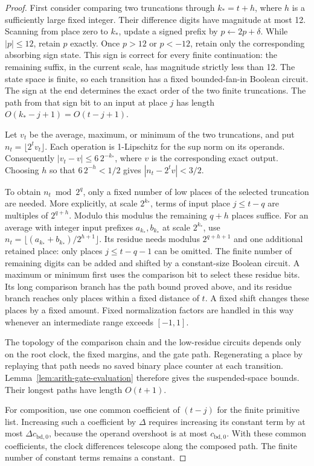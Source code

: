 \documentclass[11pt]{article}
\numberwithin{equation}{section}
\theoremstyle{definition}
\theoremstyle{remark}
\begin{document}
\begin{proof}
First consider comparing two truncations through ${k_*}=t+h$, where $h$
is a sufficiently large fixed integer.  Their difference digits have
magnitude at most 12.  Scanning from place zero to ${k_*}$, update a signed
prefix by $p\leftarrow2p+\delta$.  While $|p|\leq12$, retain $p$
exactly.  Once $p>12$ or $p<-12$, retain only the corresponding
absorbing sign state.  This sign is correct for every finite
continuation: the remaining suffix, in the current scale, has
magnitude strictly less than 12.  The state space is finite, so each
transition has a fixed bounded-fan-in Boolean circuit.  The sign
at the end determines the exact order of the two finite truncations.
The path from that sign bit to an input at place $j$ has length
$O({k_*}-j+1)=O(t-j+1)$.

Let $v_t$ be the average, maximum, or minimum of the two
truncations, and put ${n}_t=\lfloor2^tv_t\rfloor$.  Each operation is
1-Lipschitz for the sup norm on its operands.  Consequently
$|v_t-v|\leq6\,2^{-{k_*}}$, where $v$ is the corresponding exact output.
Choosing $h$ so that $6\,2^{-h}<1/2$ gives
$|{n}_t-2^tv|<3/2$.

To obtain ${n}_t\bmod2^q$, only a fixed number of low places of the
selected truncation are needed.  More explicitly, at scale $2^{k_*}$,
terms of input place $j\leq t-q$ are multiples of $2^{q+h}$.
Modulo this modulus the remaining $q+h$ places suffice.  For an
average with integer input prefixes ${a}_{k_*},{b}_{k_*}$ at scale $2^{k_*}$,
use ${n}_t=\lfloor({a}_{k_*}+{b}_{k_*})/2^{h+1}\rfloor$.  Its residue needs
modulus $2^{q+h+1}$ and one additional retained place:
only places $j\leq t-q-1$ can be omitted.  The finite number
of remaining digits can be added and shifted by a constant-size
Boolean circuit.  A maximum or minimum first uses the comparison
bit to select these residue bits.  Its long comparison branch has
the path bound proved above, and its residue branch reaches only
places within a fixed distance of $t$.  A fixed shift changes these
places by a fixed amount.  Fixed normalization factors are handled
in this way whenever an intermediate range exceeds $[-1,1]$.

The topology of the comparison chain and the low-residue circuits
depends only on the root clock, the fixed margins, and the gate
path.  Regenerating a place by replaying that path needs no saved
binary place counter at each transition.  Lemma~\ref{lem:arith-gate-evaluation}
therefore gives the suspended-space bounds.  Their longest paths
have length $O(t+1)$.

For composition, use one common coefficient of $(t-j)$ for the
finite primitive list.  Increasing such a coefficient by $\Delta$
requires increasing its constant term by at most $\Delta {c_{\mathrm{bd},0}}$,
because the operand overshoot is at most ${c_{\mathrm{bd},0}}$.  With these common
coefficients, the clock differences telescope along the composed
path.  The finite number of constant terms remains a constant.
\end{proof}
\end{document}
